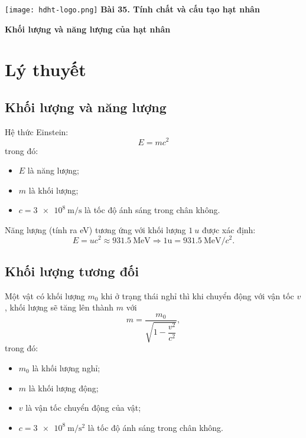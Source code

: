 \newcommand{\chapter}[2][]{
	\newcommand{\chapname}{#2}
	\begin{flushleft}
		\begin{minipage}[t]{\linewidth}
			\texttt{[image: hdht-logo.png]}
			\hspace{0pt}	
			\sffamily\bfseries\large Bài 35. Tính chất và cấu tạo hạt nhân
			\begin{flushleft}
				\huge\bfseries #1
			\end{flushleft}
		\end{minipage}
	\end{flushleft}
	\vspace{1cm}
	\normalfont\normalsize
}
\chapter[Khối lượng và năng lượng của hạt nhân]{Khối lượng và năng lượng của hạt nhân}
\section{Lý thuyết}

	\subsection{Khối lượng và năng lượng}
		Hệ thức Einstein:
		\begin{equation}
		E=mc^2
		\end{equation}
		trong đó:
		\begin{itemize}
			\item $E$ là năng lượng;
			\item $m$ là khối lượng;
			\item $c=\SI{3e8}{\meter/\second}$ là tốc độ ánh sáng trong chân không.
		\end{itemize}
		Năng lượng (tính ra eV) tương ứng với khối lượng $\SI{1}{u}$ được xác định:
		\begin{equation}
		E=uc^2\approx\SI{931,5}{\MeV}
		\Rightarrow 1\text{u}=\SI{931,5}{\MeV/c^2}.
		\end{equation}
	\subsection{Khối lượng tương đối}
		Một vật có khối lượng $m_0$ khi ở trạng thái nghỉ thì khi chuyển động với vận tốc $v$, khối lượng sẽ tăng lên thành $m$ với
		\begin{equation}
		m=\dfrac{m_0}{\sqrt{1-\dfrac{v^2}{c^2}}},
		\end{equation}
		trong đó:
		\begin{itemize}
			\item $m_0$ là khối lượng nghỉ;
			\item $m$ là khối lượng động;
			\item $v$ là vận tốc chuyển động của vật;
			\item $c=\SI{3e8}{\meter/\second^2}$ là tốc độ ánh sáng trong chân không.
		\end{itemize}
